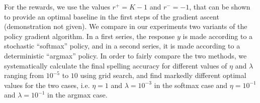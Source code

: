 \documentclass[conference]{IEEEtran}
\begin{document}
For the rewards, we use the values $r^+ = K-1$ and 
 $r^- = -1$, that can be shown to provide an optimal baseline 
 in the first steps of the gradient ascent (demonstration not given).
We compare in our experiments two variants of the policy gradient algorithm. 
In a first series, the response $y$ is 
made according to a stochastic ``softmax'' policy, 
and in a second series, it is made according to a deterministic ``argmax'' policy.
In order to fairly compare the two methods, 
we systematically calculate the final spelling accuracy for different values of 
$\eta$ and $\lambda$ ranging from $10^{-5}$ to $10$ using grid search, and find 
markedly different optimal values for
the two cases, i.e. $\eta = 1$ and $\lambda = 10^{-3}$ in the softmax case and
$\eta = 10^{-1}$ and $\lambda = 10^{-1}$ in the argmax case.
\end{document}
